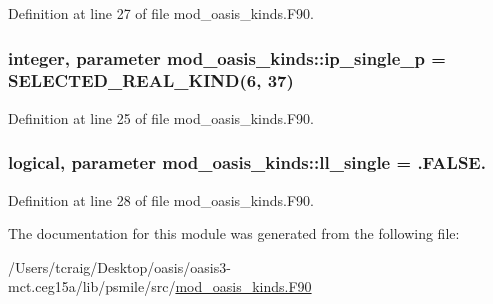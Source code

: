 Definition at line 27 of file mod\+\_\+oasis\+\_\+kinds.\+F90.

\hypertarget{classmod__oasis__kinds_a298ab0c96a80ba12ba8969e6bcd186ed}{
\subsubsection[{ip\+\_\+single\+\_\+p}]{\setlength{\rightskip}{0pt plus 5cm}integer, parameter mod\+\_\+oasis\+\_\+kinds\+::ip\+\_\+single\+\_\+p = S\+E\+L\+E\+C\+T\+E\+D\+\_\+\+R\+E\+A\+L\+\_\+\+K\+I\+N\+D(6, 37)}}\label{classmod__oasis__kinds_a298ab0c96a80ba12ba8969e6bcd186ed}


Definition at line 25 of file mod\+\_\+oasis\+\_\+kinds.\+F90.

\hypertarget{classmod__oasis__kinds_ae462c851305d5fe6ef6178c9dcac4468}{
\subsubsection[{ll\+\_\+single}]{\setlength{\rightskip}{0pt plus 5cm}logical, parameter mod\+\_\+oasis\+\_\+kinds\+::ll\+\_\+single = .F\+A\+L\+S\+E.}}\label{classmod__oasis__kinds_ae462c851305d5fe6ef6178c9dcac4468}


Definition at line 28 of file mod\+\_\+oasis\+\_\+kinds.\+F90.



The documentation for this module was generated from the following file\+:\begin{DoxyCompactItemize}
\item 
/\+Users/tcraig/\+Desktop/oasis/oasis3-\/mct.\+ceg15a/lib/psmile/src/\hyperlink{mod__oasis__kinds_8_f90}{mod\+\_\+oasis\+\_\+kinds.\+F90}\end{DoxyCompactItemize}
